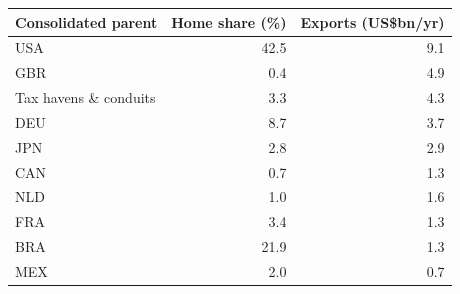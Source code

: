 \begin{tabular}{lrr}
\toprule
Consolidated parent & Home share (\%) & Exports (US\$bn/yr) \\
\midrule
USA & 42.5 & 9.1 \\
GBR & 0.4 & 4.9 \\
Tax havens \& conduits & 3.3 & 4.3 \\
DEU & 8.7 & 3.7 \\
JPN & 2.8 & 2.9 \\
CAN & 0.7 & 1.3 \\
NLD & 1.0 & 1.6 \\
FRA & 3.4 & 1.3 \\
BRA & 21.9 & 1.3 \\
MEX & 2.0 & 0.7 \\
\bottomrule
\end{tabular}
